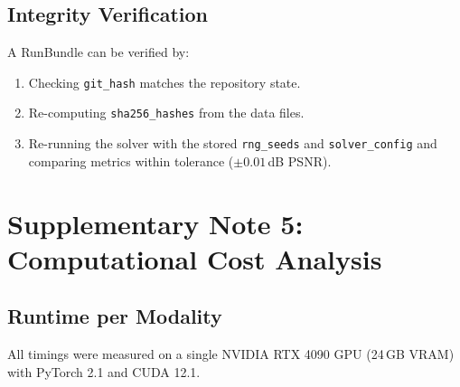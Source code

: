 \documentclass[11pt]{article}
\begin{document}
\subsection{Integrity Verification}

A RunBundle can be verified by:
\begin{enumerate}
  \item Checking \texttt{git\_hash} matches the repository state.
  \item Re-computing \texttt{sha256\_hashes} from the data files.
  \item Re-running the solver with the stored \texttt{rng\_seeds} and
        \texttt{solver\_config} and comparing metrics within tolerance
        ($\pm0.01$\,dB PSNR).
\end{enumerate}

\newpage

\section{Supplementary Note 5: Computational Cost Analysis}
\label{sec:cost}

\subsection{Runtime per Modality}

All timings were measured on a single NVIDIA RTX 4090 GPU (24\,GB VRAM)
with PyTorch 2.1 and CUDA 12.1.
\end{document}
